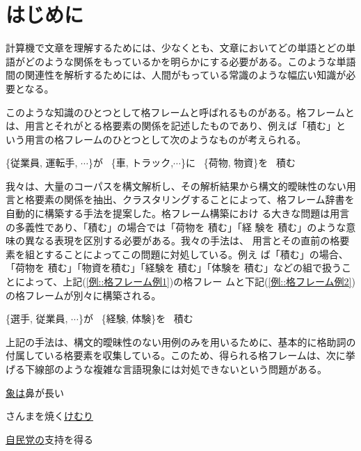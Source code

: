 \documentclass[fleqn]{nlp}
\begin{document}

\maketitle


\section{はじめに}

計算機で文章を理解するためには、少なくとも、文章においてどの単語とどの単
語がどのような関係をもっているかを明らかにする必要がある。このような単語
間の関連性を解析するためには、人間がもっている常識のような幅広い知識が必
要となる。

このような知識のひとつとして格フレームと呼ばれるものがある。格フレームと
は、用言とそれがとる格要素の関係を記述したものであり、例えば「積む」と
いう用言の格フレームのひとつとして次のようなものが考えられる。

\begin{exe}
 \ex \label{例::格フレーム例1} {\{従業員, 運転手, $\cdots$\}が} \ {\{車, トラック,$\cdots$\}に} \ {\{荷物, 物資\}を} \ {積む}
\end{exe}

我々は、大量のコーパスを構文解析し、その解析結果から構文的曖昧性のない用
言と格要素の関係を抽出、クラスタリングすることによって、格フレーム辞書を
自動的に構築する手法を提案した\cite{Kawahara2002}。格フレーム構築におけ
る大きな問題は用言の多義性であり、「積む」の場合では「荷物を 積む」「経
験を 積む」のような意味の異なる表現を区別する必要がある。我々の手法は、
用言とその直前の格要素を組とすることによってこの問題に対処している。例え
ば「積む」の場合、「荷物を 積む」「物資を積む」「経験を 積む」「体験を 
積む」などの組で扱うことによって、上記(\ref{例::格フレーム例1})の格フレー
ムと下記(\ref{例::格フレーム例2})の格フレームが別々に構築される。

\begin{exe}
 \ex \label{例::格フレーム例2} \{選手, 従業員, $\cdots$\}が \ \{経験, 体験\}を \ 積む
\end{exe}

上記の手法は、構文的曖昧性のない用例のみを用いるために、基本的に格助詞の
付属している格要素を収集している。このため、得られる格フレームは、次に挙
げる下線部のような複雑な言語現象には対処できないという問題がある。

\begin{exe}
 \ex\label{例::象は鼻が長い} \underline{象は}鼻が長い

 \ex\label{例::さんまを焼くけむり} さんまを焼く\underline{けむり}

 \ex\label{例::自民党の支持を得る} \underline{自民党の}支持を得る
\end{exe}
\end{document}
